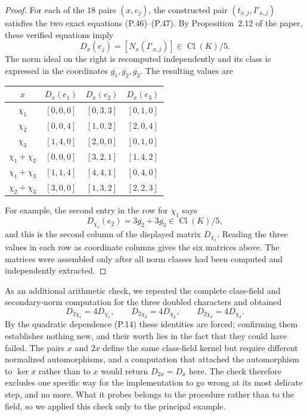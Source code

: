 \documentclass[11pt]{article}
\newcommand{\Cl}{\operatorname{Cl}}
\begin{document}
\begin{proof}
For each of the $18$ pairs $(x,e_j)$, the constructed pair
$(t_{x,j},I'_{x,j})$ satisfies the two exact equations
(P.46)--(P.47).  By Proposition~2.12 of the paper, these verified
equations imply
\[
  D_x(e_j)=[N_x(I'_{x,j})]\in\Cl(K)/5.
\]
The norm ideal on the right is recomputed independently and its class is
expressed in the coordinates
$\overline{g_1},\overline{g_2},\overline{g_3}$.  The resulting values are
\begin{center}
\begin{tabular}{c c c c}
\toprule
$x$ & $D_x(e_1)$ & $D_x(e_2)$ & $D_x(e_3)$ \\
\midrule
$\chi_1$   & $[0,0,0]$ & $[0,3,3]$ & $[0,1,0]$ \\
$\chi_2$   & $[0,0,4]$ & $[1,0,2]$ & $[2,0,4]$ \\
$\chi_3$   & $[1,4,0]$ & $[2,0,0]$ & $[0,1,0]$ \\
$\chi_1{+}\chi_2$ & $[0,0,0]$ & $[3,2,1]$ & $[1,4,2]$ \\
$\chi_1{+}\chi_3$ & $[1,1,4]$ & $[4,4,1]$ & $[0,4,0]$ \\
$\chi_2{+}\chi_3$ & $[3,0,0]$ & $[1,3,2]$ & $[2,2,3]$ \\
\bottomrule
\end{tabular}
\end{center}
For example, the second entry in the row for $\chi_1$ says
\[
  D_{\chi_1}(e_2)=3\overline{g_2}+3\overline{g_3}\in\Cl(K)/5,
\]
and this is the second column of the displayed matrix $D_{\chi_1}$.  Reading the
three values in each row as coordinate columns gives the six matrices
above.  The matrices were assembled only after all norm classes had been
computed and independently extracted.
\end{proof}

As an additional arithmetic check, we repeated the complete class-field and
secondary-norm computation for the three doubled characters and obtained
\begin{equation}\label{eq:scaling-check}
  D_{2\chi_1}=4D_{\chi_1},\qquad D_{2\chi_2}=4D_{\chi_2},\qquad D_{2\chi_3}=4D_{\chi_3}.
\end{equation}
By the quadratic dependence (P.14) these identities are forced;
confirming them establishes nothing new, and their worth lies in the fact that
they could have failed.  The pairs $x$ and $2x$ define the same class-field
kernel but require different normalized automorphisms, and a computation that
attached the automorphism to $\ker x$ rather than to $x$ would return
$D_{2x}=D_x$ here.  The check therefore excludes one specific way for the
implementation to go wrong at its most delicate step, and no more.  What it
probes belongs to the procedure rather than to the field, so we
applied this check only to the principal example.
\end{document}
